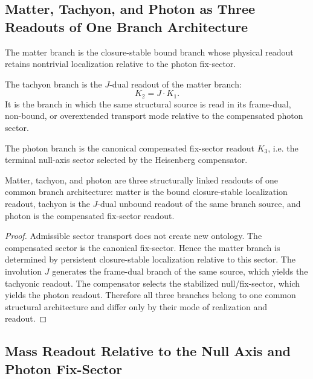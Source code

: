 \subsection{Matter, Tachyon, and Photon as Three Readouts of One Branch Architecture}
\label{subsec:mtp-readout}

\begin{definition}
The matter branch is the closure-stable bound branch whose physical readout
retains nontrivial localization relative to the photon fix-sector.
\end{definition}

\begin{definition}
The tachyon branch is the $J$-dual readout of the matter branch:
\[
K_2 = J\!\cdot\!K_1.
\]
It is the branch in which the same structural source is read in its frame-dual,
non-bound, or overextended transport mode relative to the compensated photon
sector.
\end{definition}

\begin{definition}
The photon branch is the canonical compensated fix-sector readout $K_3$, i.e. the terminal null-axis sector selected by the Heisenberg compensator.
\end{definition}

\begin{theorem}
\label{thm:three-readout-principle}
Matter, tachyon, and photon are three structurally linked readouts of one
common branch architecture: matter is the bound closure-stable localization
readout, tachyon is the $J$-dual unbound readout of the same branch source,
and photon is the compensated fix-sector readout.
\end{theorem}

\begin{proof}
Admissible sector transport does not create new ontology. The compensated
sector is the canonical fix-sector. Hence the matter branch is determined by
persistent closure-stable localization relative to this sector. The involution
$J$ generates the frame-dual branch of the same source, which yields the
tachyonic readout. The compensator selects the stabilized null/fix-sector,
which yields the photon readout. Therefore all three branches belong to one
common structural architecture and differ only by their mode of realization and
readout.
\end{proof}

\subsection{Mass Readout Relative to the Null Axis and Photon Fix-Sector}
\label{subsec:mass-null-axis}

